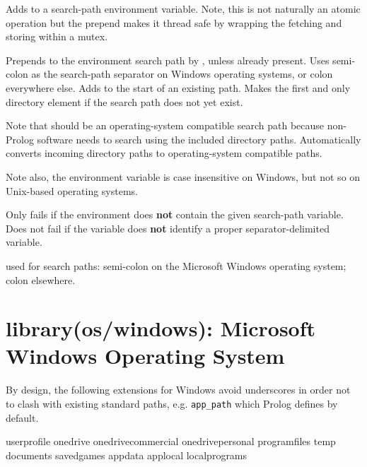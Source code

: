 \begin{description}
Adds  to a search-path environment variable. Note, this is
not naturally an atomic operation but the prepend makes it thread
safe by wrapping the fetching and storing within a mutex.

Prepends  to the environment search path by , unless
already present. Uses semi-colon as the search-path separator on
Windows operating systems, or colon everywhere else. Adds 
to the start of an existing path. Makes  the first and only
directory element if the search path does not yet exist.

Note that  should be an operating-system compatible search
path because non-Prolog software needs to search using the included
directory paths. Automatically converts incoming directory paths to
operating-system compatible paths.

Note also, the environment variable  is case insensitive on
Windows, but not so on Unix-based operating systems.

\nodescription
Only fails if the environment does \textbf{not} contain the given
search-path variable. Does not fail if the variable does \textbf{not}
identify a proper separator-delimited variable.

 used for search paths: semi-colon on the Microsoft Windows
operating system; colon elsewhere.
\end{description}

\chapter{library(os/windows): Microsoft Windows Operating System}\label{sec:windows}

By design, the following extensions for Windows avoid underscores
in order not to clash with existing standard paths, e.g. \verb$app_path$
which Prolog defines by default.

\begin{code}
userprofile
onedrive
onedrivecommercial
onedrivepersonal
programfiles
temp
documents
savedgames
appdata
applocal
localprograms
\end{code}

